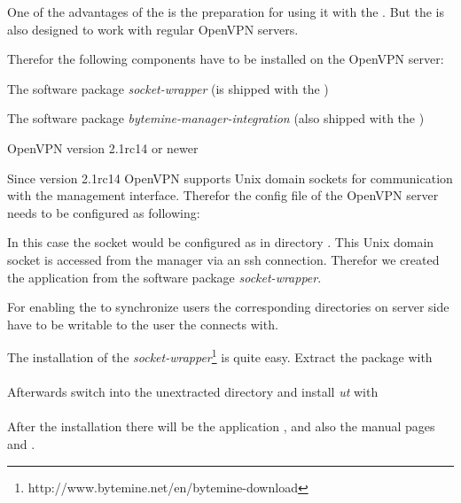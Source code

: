 \nl One of the advantages of the \Nboa{} is the preparation for
using it with the \Nbm{}. But the \Nbm{} is also designed to work with
regular OpenVPN servers.

Therefor the following components have to be installed on the OpenVPN
server:

\begin{items}
    \item The software package \textsl{socket-wrapper}
        (is shipped with the \Nbm{})
    \item The software package \textsl{bytemine-manager-integration}
        (also shipped with the \Nbm{})
   \item OpenVPN version 2.1rc14 or newer
\end{items}




\nl Since version 2.1rc14 OpenVPN supports Unix domain sockets for
communication with the management interface. Therefor the config file of the
OpenVPN server needs to be configured as following:

\nl{}

\nl In this case the socket would be configured as  in
directory .
%
This Unix domain socket is accessed from the manager via an ssh connection.
Therefor we created the application  from the software package
\textsl{socket-wrapper}.

For enabling the \Nbm{} to synchronize users the corresponding directories
on server side have to be writable to the user the \Nbm{} connects with.

\newpage



\nl The installation of the
\textsl{socket-wrapper}\footnote{http://www.bytemine.net/en/bytemine-download}
is quite easy. Extract the package with\\
\textit{}\\
Afterwards switch into the unextracted directory and install \textit{ut}
with \\
\textit{}\\

After the installation there will be the application ,
and also the manual pages  and .


